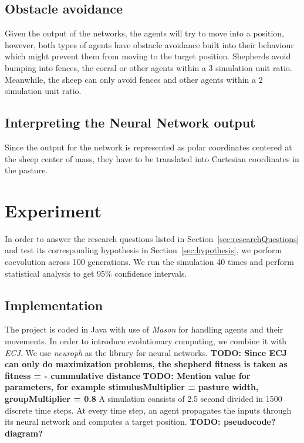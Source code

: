 \documentclass[conference]{IEEEtran}
\begin{document}
\subsection{Obstacle avoidance}
\label{sec:obstacle_avoidance}
Given the output of the networks, the agents will try to move into a position, however, both types of agents have obstacle avoidance built into their behaviour which might prevent them from moving to the target position. Shepherds avoid bumping into fences, the corral or other agents within a 3 simulation unit ratio. Meanwhile, the sheep can only avoid fences and other agents within a 2 simulation unit ratio. 

\subsection{Interpreting the Neural Network output}
\label{sec:NN_output_interpretation}
Since the output for the network is represented as polar coordinates centered at the sheep center of mass, they have to be translated into Cartesian coordinates in the pasture. 





\section{Experiment}
\label{sec:experiment}
In order to answer the research questions listed in Section~\ref{sec:researchQuestions} and test its corresponding hypothesis in Section~\ref{sec:hypothesis}, we perform coevolution across 100 generations. 
We run the simulation 40 times and perform statistical analysis to get 95\% confidence intervals.


\subsection{Implementation}
The project is coded in Java with use of \textit{Mason} for handling agents and their movements. In order to introduce evolutionary computing, we combine it with \textit{ECJ}. We use \textit{neuroph} as the library for neural networks. 
\textbf{TODO: Since ECJ can only do maximization problems, the shepherd fitness is taken as 
fitness = - cummulative distance}
\textbf{TODO: Mention value for parameters, for example stimulusMultiplier = pasture width, groupMultiplier = 0.8}
A simulation consists of 2.5 second divided in 1500 discrete time steps. At every time step, an agent propagates the inputs through its neural network and computes a target position.
\textbf{TODO: pseudocode? diagram?}
\end{document}

